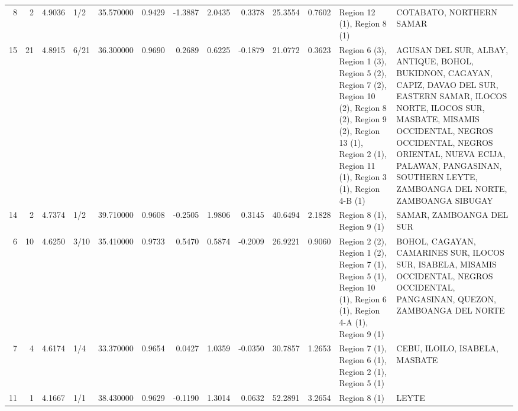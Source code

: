 \begin{tabular}{rrrlrrrrrrrll}
8 & 2 & {\cellcolor[HTML]{BFD3F6}} \color[HTML]{000000} 4.9036 & 1/2 & {\cellcolor[HTML]{7396F5}} \color[HTML]{F1F1F1} 35.570000 & 0.9429 & -1.3887 & 2.0435 & 0.3378 & 25.3554 & 0.7602 & Region 12 (1), Region 8 (1) & COTABATO, NORTHERN SAMAR \\
15 & 21 & {\cellcolor[HTML]{BCD2F7}} \color[HTML]{000000} 4.8915 & 6/21 & {\cellcolor[HTML]{82A6FB}} \color[HTML]{F1F1F1} 36.300000 & 0.9690 & 0.2689 & 0.6225 & -0.1879 & 21.0772 & 0.3623 & Region 6 (3), Region 1 (3), Region 5 (2), Region 7 (2), Region 10 (2), Region 8 (2), Region 9 (2), Region 13 (1), Region 2 (1), Region 11 (1), Region 3 (1), Region 4-B (1) & AGUSAN DEL SUR, ALBAY, ANTIQUE, BOHOL, BUKIDNON, CAGAYAN, CAPIZ, DAVAO DEL SUR, EASTERN SAMAR, ILOCOS NORTE, ILOCOS SUR, MASBATE, MISAMIS OCCIDENTAL, NEGROS OCCIDENTAL, NEGROS ORIENTAL, NUEVA ECIJA, PALAWAN, PANGASINAN, SOUTHERN LEYTE, ZAMBOANGA DEL NORTE, ZAMBOANGA SIBUGAY \\
14 & 2 & {\cellcolor[HTML]{A1C0FF}} \color[HTML]{000000} 4.7374 & 1/2 & {\cellcolor[HTML]{CBD8EE}} \color[HTML]{000000} 39.710000 & 0.9608 & -0.2505 & 1.9806 & 0.3145 & 40.6494 & 2.1828 & Region 8 (1), Region 9 (1) & SAMAR, ZAMBOANGA DEL SUR \\
6 & 10 & {\cellcolor[HTML]{8BADFD}} \color[HTML]{000000} 4.6250 & 3/10 & {\cellcolor[HTML]{6F92F3}} \color[HTML]{F1F1F1} 35.410000 & 0.9733 & 0.5470 & 0.5874 & -0.2009 & 26.9221 & 0.9060 & Region 2 (2), Region 1 (2), Region 7 (1), Region 5 (1), Region 10 (1), Region 6 (1), Region 4-A (1), Region 9 (1) & BOHOL, CAGAYAN, CAMARINES SUR, ILOCOS SUR, ISABELA, MISAMIS OCCIDENTAL, NEGROS OCCIDENTAL, PANGASINAN, QUEZON, ZAMBOANGA DEL NORTE \\
7 & 4 & {\cellcolor[HTML]{89ACFD}} \color[HTML]{000000} 4.6174 & 1/4 & {\cellcolor[HTML]{465ECF}} \color[HTML]{F1F1F1} 33.370000 & 0.9654 & 0.0427 & 1.0359 & -0.0350 & 30.7857 & 1.2653 & Region 7 (1), Region 6 (1), Region 2 (1), Region 5 (1) & CEBU, ILOILO, ISABELA, MASBATE \\
11 & 1 & {\cellcolor[HTML]{3B4CC0}} \color[HTML]{F1F1F1} 4.1667 & 1/1 & {\cellcolor[HTML]{B1CBFC}} \color[HTML]{000000} 38.430000 & 0.9629 & -0.1190 & 1.3014 & 0.0632 & 52.2891 & 3.2654 & Region 8 (1) & LEYTE \\
\bottomrule
\end{tabular}
